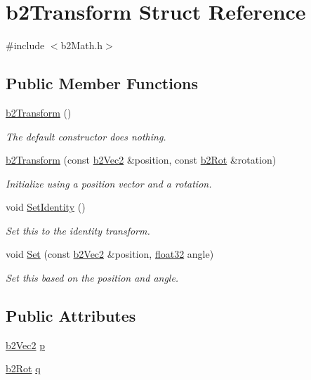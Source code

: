 \hypertarget{structb2_transform}{}\section{b2\+Transform Struct Reference}
\label{structb2_transform}


{\ttfamily \#include $<$b2\+Math.\+h$>$}

\subsection*{Public Member Functions}
\begin{DoxyCompactItemize}
\item 
\mbox{\hyperlink{structb2_transform_a765a2e5c692a2e1d05c7a5441019373d}{b2\+Transform}} ()
\begin{DoxyCompactList}\small\item\em The default constructor does nothing. \end{DoxyCompactList}\item 
\mbox{\hyperlink{structb2_transform_a823e190e4810e35e8100f4414d0bef62}{b2\+Transform}} (const \mbox{\hyperlink{structb2_vec2}{b2\+Vec2}} \&position, const \mbox{\hyperlink{structb2_rot}{b2\+Rot}} \&rotation)
\begin{DoxyCompactList}\small\item\em Initialize using a position vector and a rotation. \end{DoxyCompactList}\item 
void \mbox{\hyperlink{structb2_transform_af92af4ec6833552b1b22a6ca6d4f5644}{Set\+Identity}} ()
\begin{DoxyCompactList}\small\item\em Set this to the identity transform. \end{DoxyCompactList}\item 
void \mbox{\hyperlink{structb2_transform_a4db696a0b3fada95f95cde3e7e85ced9}{Set}} (const \mbox{\hyperlink{structb2_vec2}{b2\+Vec2}} \&position, \mbox{\hyperlink{b2_settings_8h_aacdc525d6f7bddb3ae95d5c311bd06a1}{float32}} angle)
\begin{DoxyCompactList}\small\item\em Set this based on the position and angle. \end{DoxyCompactList}\end{DoxyCompactItemize}
\subsection*{Public Attributes}
\begin{DoxyCompactItemize}
\item 
\mbox{\hyperlink{structb2_vec2}{b2\+Vec2}} \mbox{\hyperlink{structb2_transform_a9eeeb643a016c29a4d389e480ba6c628}{p}}
\item 
\mbox{\hyperlink{structb2_rot}{b2\+Rot}} \mbox{\hyperlink{structb2_transform_ae4aaac23f32686e165138c4e5dc4ce85}{q}}
\end{DoxyCompactItemize}


